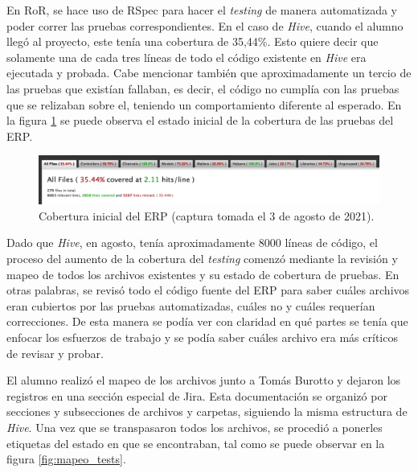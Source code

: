   En RoR, se hace uso de RSpec para hacer el \textit{testing} de manera automatizada y poder correr las pruebas correspondientes. En el caso de \textit{Hive}, cuando el alumno llegó al proyecto, este tenía una cobertura de 35,44\%. Esto quiere decir que solamente una de cada tres líneas de todo el código existente en \textit{Hive} era ejecutada y probada. Cabe mencionar también que aproximadamente un tercio de las pruebas que existían fallaban, es decir, el código no cumplía con las pruebas que se relizaban sobre el, teniendo un comportamiento diferente al esperado.
   En la figura \ref{fig:testing_original} se puede observa el estado inicial de la cobertura de las pruebas del ERP.

  \begin{figure}[H]
    \centering
    \includegraphics[width=\linewidth]{figures/testing/testing_original.png}
    \caption{Cobertura inicial del ERP (captura tomada el 3 de agosto de 2021).}
    \label{fig:testing_original}
  \end{figure}

  Dado que \textit{Hive}, en agosto, tenía aproximadamente 8000 líneas de código, el proceso del aumento de la cobertura del \textit{testing} comenzó mediante la revisión y mapeo de todos los archivos existentes y su estado de cobertura de pruebas. En otras palabras, se revisó todo el código fuente del ERP para saber cuáles archivos eran cubiertos por las pruebas automatizadas, cuáles no y cuáles requerían correcciones. De esta manera se podía ver con claridad en qué partes se tenía que enfocar los esfuerzos de trabajo y se podía saber cuáles archivo era más críticos de revisar y probar.

  El alumno realizó el mapeo de los archivos junto a Tomás Burotto y dejaron los registros en una sección especial de Jira. Esta documentación se organizó por secciones y subsecciones de archivos y carpetas, siguiendo la misma estructura de \textit{Hive}. Una vez que se transpasaron todos los archivos, se procedió a ponerles etiquetas del estado en que se encontraban, tal como se puede observar en la figura \ref{fig:mapeo_tests}.
  
